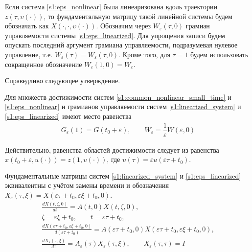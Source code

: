 \documentclass[../main.tex]{subfiles}
\begin{document}
Если система \eqref{s1:eps_nonlinear} была линеаризована вдоль траектории $ z(\tau, \upsilon(\cdot)) $, то фундаментальную матрицу такой линейной системы будем обозначать как $X(\cdot,\cdot, \upsilon(\cdot)) $.
Обозначим через $ W_{\varepsilon}(\tau, 0) $ грамиан управляемости системы \eqref{s1:eps_linearized}. 
Для упрощения записи будем опускать последний аргумент грамиана управляемости, подразумевая нулевое управление, т.е. $W_{\varepsilon}(\tau) = W_{\varepsilon}(\tau, 0) $.
Кроме того, для $\tau = 1$ будем использовать сокращенное обозначение $W_{\varepsilon}(1, 0) = W_{\varepsilon}$. 

Справедливо следующее утверждение.

\begin{utv}\label{s1:utv:connection_with_scaled_system}
    {\textit Для множеств достижимости систем \eqref{s1:common_nonlinear_small_time} и \eqref{s1:eps_nonlinear} и грамианов управляемости систем \eqref{s1:linearized_system} и \eqref{s1:eps_linearized} имеют место равенства}
    \begin{gather*}
        G_{\varepsilon}(1) = G(t_0 + \varepsilon),  \qquad
        W_{\varepsilon} = \dfrac{1}{\varepsilon} W(\varepsilon, 0)
    \end{gather*}
\end{utv}

\doc 
Действительно, равенства областей достижимости следует из равенства $ x(t_0 + \varepsilon, u(\cdot)) = z(1, \upsilon(\cdot)) $, где  $ \upsilon(\tau) = \varepsilon u(\varepsilon \tau + t_0)  $.

Фундаментальные матрицы систем \eqref{s1:linearized_system} и \eqref{s1:eps_linearized} эквивалентны с учётом замены времени и обозначения $ X_{\varepsilon}(\tau,\xi) = X(\varepsilon \tau + t_0,\varepsilon \xi + t_0, 0) $.
\begin{gather*}
	\frac{dX(t,\zeta, 0)}{dt} = A(t, 0) X(t,\zeta, 0), \\
	\zeta = \varepsilon \xi + t_0, \qquad t = \varepsilon \tau + t_0, \\
	\frac{dX(\varepsilon \tau + t_0, \varepsilon \xi + t_0, 0)}{d(\varepsilon \tau + t_0)} = A(\varepsilon \tau + t_0, 0) X(\varepsilon \tau + t_0,\varepsilon \xi + t_0, 0), \\
	\frac{dX_{ \varepsilon}(\tau,\xi)}{d\tau} =  A_{\varepsilon}(\tau)  X_{ \varepsilon}(\tau,\xi), \qquad X_{\varepsilon}(\tau,\tau) = I
\end{gather*}
\end{document}
